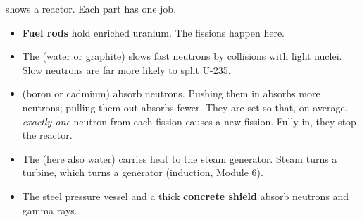  shows a reactor. Each part has one job.
\begin{itemize}
  \item \textbf{Fuel rods} hold enriched uranium. The fissions happen here.
  \item The  (water or graphite) slows fast neutrons by collisions
        with light nuclei. Slow neutrons are far more likely to split U-235.
  \item {} (boron or cadmium) absorb neutrons. Pushing them in
        absorbs more neutrons; pulling them out absorbs fewer. They are set so that,
        on average, \emph{exactly one} neutron from each fission causes a new
        fission. Fully in, they stop the reactor.
  \item The  (here also water) carries heat to the steam generator.
        Steam turns a turbine, which turns a generator (induction, Module 6).
  \item The steel pressure vessel and a thick \textbf{concrete shield} absorb
        neutrons and gamma rays.
\end{itemize}

